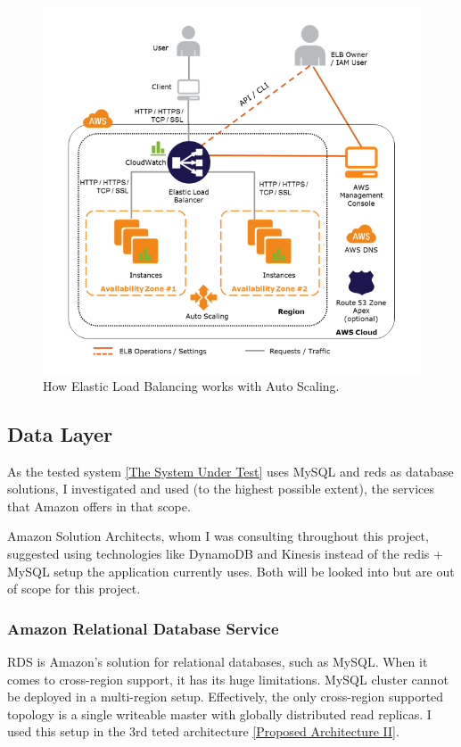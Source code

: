 \documentclass{uvamscse}
\begin{document}
\begin{figure}[H]
\centering
\includegraphics[scale=0.5]{elbautoscale}
\caption{How Elastic Load Balancing works with Auto Scaling.}
\label{figure:elbautoscale}
\end{figure}

\subsection{Data Layer}
As the tested system \ref{The System Under Test} uses MySQL and reds as database solutions, I investigated and used (to the highest possible extent), the services that Amazon offers in that scope.

Amazon Solution Architects, whom I was consulting throughout this project, suggested using technologies like DynamoDB and Kinesis instead of the redis + MySQL setup the application currently uses. Both will be looked into but are out of scope for this project.

\subsubsection{Amazon Relational Database Service}

RDS is Amazon's solution for relational databases, such as MySQL. When it comes to cross-region support, it has its huge limitations. MySQL cluster cannot be deployed in a multi-region setup. Effectively, the only cross-region supported topology is a single writeable master with globally distributed read replicas. I used this setup in the 3rd teted architecture \ref{Proposed Architecture II}.
\end{document}
